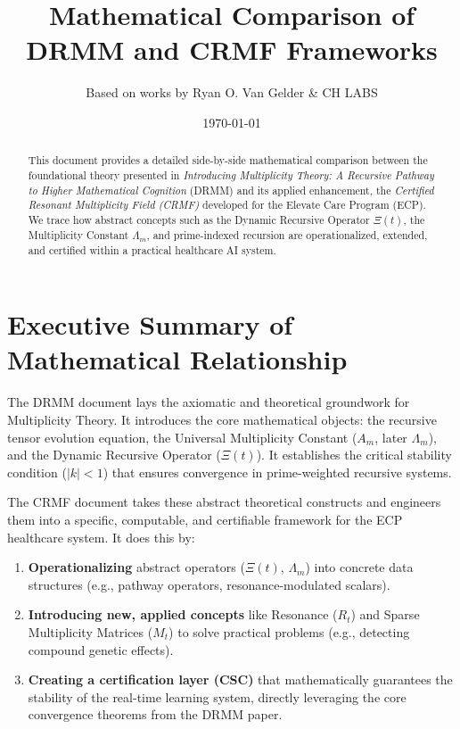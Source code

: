 \documentclass[12pt]{article}
\title{Mathematical Comparison of \\ DRMM and CRMF Frameworks}
\author{Based on works by Ryan O. Van Gelder \& CH LABS}
\date{\today}
\begin{document}
\maketitle

\begin{abstract}
This document provides a detailed side-by-side mathematical comparison between the foundational theory presented in \textit{Introducing Multiplicity Theory: A Recursive Pathway to Higher Mathematical Cognition} (DRMM) and its applied enhancement, the \textit{Certified Resonant Multiplicity Field (CRMF)} developed for the Elevate Care Program (ECP). We trace how abstract concepts such as the Dynamic Recursive Operator $\Xi(t)$, the Multiplicity Constant $\Lambda_m$, and prime-indexed recursion are operationalized, extended, and certified within a practical healthcare AI system.
\end{abstract}

\section{Executive Summary of Mathematical Relationship}

The DRMM document lays the axiomatic and theoretical groundwork for Multiplicity Theory. It introduces the core mathematical objects: the recursive tensor evolution equation, the Universal Multiplicity Constant ($A_m$, later $\Lambda_m$), and the Dynamic Recursive Operator ($\Xi(t)$). It establishes the critical stability condition ($|k|<1$) that ensures convergence in prime-weighted recursive systems.

The CRMF document takes these abstract theoretical constructs and engineers them into a specific, computable, and certifiable framework for the ECP healthcare system. It does this by:
\begin{enumerate}
    \item \textbf{Operationalizing} abstract operators ($\Xi(t)$, $\Lambda_m$) into concrete data structures (e.g., pathway operators, resonance-modulated scalars).
    \item \textbf{Introducing new, applied concepts} like Resonance ($R_t$) and Sparse Multiplicity Matrices ($M_t$) to solve practical problems (e.g., detecting compound genetic effects).
    \item \textbf{Creating a certification layer (CSC)} that mathematically guarantees the stability of the real-time learning system, directly leveraging the core convergence theorems from the DRMM paper.
\end{enumerate}
\end{document}
